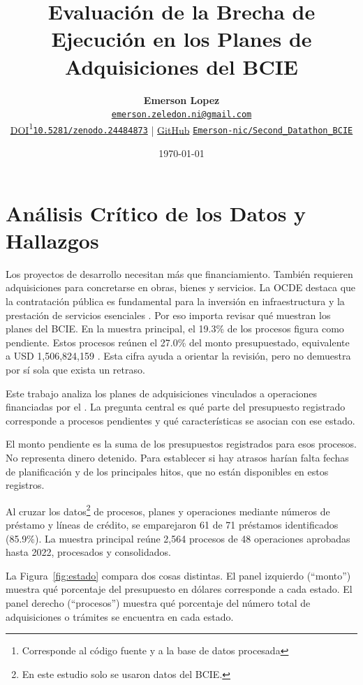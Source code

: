 \documentclass[11pt,letterpaper]{article}
\title{%
	\vspace{-1.2cm}
	\Large \bfseries \color{black} Evaluación de la Brecha de Ejecución en los Planes de Adquisiciones del BCIE
}
\author{%
	\textbf{\normalsize Emerson Lopez}\hspace{0.4em}\raisebox{1.2ex}{\href{https://orcid.org/0009-0009-6423-2883}{\orcidicon}} \\
	\footnotesize \href{mailto:emerson.zeledon.ni@gmail.com}{\texttt{emerson.zeledon.ni@gmail.com}} \\
	\footnotesize \href{https://doi.org/10.5281/zenodo.24484873}{DOI}\footnote{Corresponde al código fuente y a la base de datos procesada}\hspace{0.25em}\href{https://doi.org/10.5281/zenodo.24484873}{\texttt{10.5281/zenodo.24484873}} \quad | \quad
	\href{https://github.com/Emerson-nic/Second_Datathon_BCIE}{GitHub} \href{https://github.com/Emerson-nic/Second_Datathon_BCIE}{\texttt{Emerson-nic/Second\_Datathon\_BCIE}}
}
\date{\footnotesize \today}
\begin{document}
	
	\maketitle
	\vspace{-0.4cm}
	
	\section{Análisis Crítico de los Datos y Hallazgos}
	\label{sec:analisis}
	
	Los proyectos de desarrollo necesitan más que financiamiento. También requieren adquisiciones para concretarse en obras, bienes y servicios. La OCDE destaca que la contratación pública es fundamental para la inversión en infraestructura y la prestación de servicios esenciales \parencite{ocde2015procurement}. Por eso importa revisar qué muestran los planes del BCIE. En la muestra principal, el 19.3\% de los procesos figura como pendiente. Estos procesos reúnen el 27.0\% del monto presupuestado, equivalente a USD 1,506,824,159 \parencite{bcie_psd2026}. Esta cifra ayuda a orientar la revisión, pero no demuestra por sí sola que exista un retraso.
	
	\medspace
	
	Este trabajo analiza los planes de adquisiciones vinculados a operaciones financiadas por el \textcite{bcie2025}. La pregunta central es qué parte del presupuesto registrado corresponde a procesos pendientes y qué características se asocian con ese estado.
	
	\medspace
	
	El monto pendiente es la suma de los presupuestos registrados para esos procesos. No representa dinero detenido. Para establecer si hay atrasos harían falta fechas de planificación y de los principales hitos, que no están disponibles en estos registros.
	
	\medspace
	
	Al cruzar los datos\footnote{En este estudio solo se usaron datos del BCIE.} de procesos, planes y operaciones mediante números de préstamo y líneas de crédito, se emparejaron 61 de 71 préstamos identificados (85.9\%). La muestra principal reúne 2,564 procesos de 48 operaciones aprobadas hasta 2022, procesados y consolidados.
	
	La Figura~\ref{fig:estado} compara dos cosas distintas. El panel izquierdo (``monto'') muestra qué porcentaje del presupuesto en dólares corresponde a cada estado. El panel derecho (``procesos'') muestra qué porcentaje del número total de adquisiciones o trámites se encuentra en cada estado.
	
\end{document}
